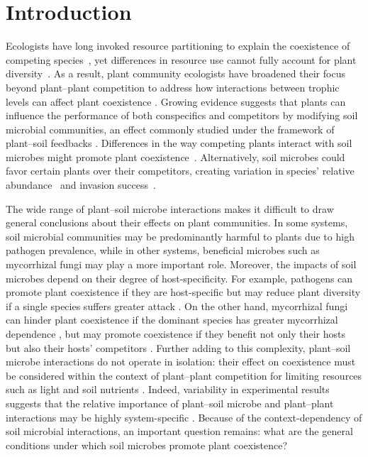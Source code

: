 \section{Introduction}
Ecologists have long invoked resource partitioning to explain the coexistence of competing species~\citep{Gause1934, tilman1982}, yet differences in resource use cannot fully account for plant diversity~\citep{Silvertown2004}. As a result, plant community ecologists have broadened their focus beyond plant--plant competition to address how interactions between trophic levels can affect plant coexistence \citep{Chesson2008, Mordecai2011, Lanuza2018, Cardinaux2018}. Growing evidence suggests that plants can influence the performance of both conspecifics and competitors by modifying soil microbial communities, an effect commonly studied under the framework of plant--soil feedbacks \citep{Bever1997, Bever2003}. Differences in the way competing plants interact with soil microbes might promote plant coexistence~\citep{Bever2003, Chung2016}. Alternatively, soil microbes could favor certain plants over their competitors, creating variation in species' relative abundance~\citep{Klironomos2002, Mangan2010} and invasion success~\citep{Reinhart2006, Ke2015}.
\par


The wide range of plant--soil microbe interactions makes it difficult to draw general conclusions about their effects on plant communities. In some systems, soil microbial communities may be predominantly harmful to plants due to high pathogen prevalence, while in other systems, beneficial microbes such as mycorrhizal fungi may play a more important role.
Moreover, the impacts of soil microbes depend on their degree of host-specificity. For example, pathogens can promote plant coexistence if they are host-specific \citep{Bell2006, Yamazaki2008, Bagchi2010} but may reduce plant diversity if a single species suffers greater attack \citep{Mordecai2011}. On the other hand, mycorrhizal fungi can hinder plant coexistence if the dominant species has greater mycorrhizal dependence \citep{Urcelay2003}, but may promote coexistence if they benefit not only their hosts but also their hosts' competitors \citep{Bever2002}.
Further adding to this complexity, plant--soil microbe interactions do not operate in isolation: their effect on coexistence must be considered within the context of plant--plant competition for limiting resources such as light and soil nutrients \citep{Callaway2004, Casper2007, Shannon2012, Crawford2017}. Indeed, variability in experimental results suggests that the relative importance of plant--soil microbe and plant--plant interactions may be highly system-specific \citep{Lekberg2018}. Because of the context-dependency of soil microbial interactions, an important question remains: what are the general conditions under which soil microbes promote plant coexistence?
\par


